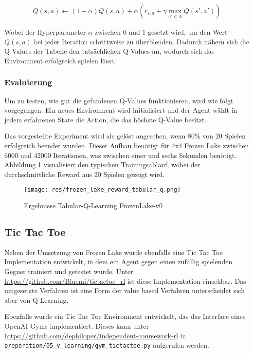\documentclass[11pt]{scrartcl}
\begin{document}
\begin{align}
  Q(s, a) \leftarrow (1 - \alpha)Q(s, a) +
  \alpha(r_{s, a} + \gamma \max_{a'\in A}Q(s', a'))
\label{aln:QValueAdapt}
\end{align}
\noindent

Wobei der Hyperparameter $\alpha$ zwischen 0 und 1 gesetzt wird, um den Wert $Q(s, a)$ bei
jeder Iteration schrittweise zu überblenden. Dadurch nähern sich die Q-Values der Tabelle
den tatsächlichen Q-Values an, wodurch sich das Environment erfolgreich spielen lässt.

\subsubsection{Evaluierung}
Um zu testen, wie gut die gefundenen Q-Values funktionieren, wird wie folgt vorgegangen.
Ein neues Environment wird initialisiert und der Agent wählt in jedem erfahrenen State die
Action, die das höchste Q-Value besitzt.

Das vorgestellte Experiment wird als gelöst angesehen, wenn 80\% von 20 Spielen erfolgreich
beendet wurden. Dieser Aufbau benötigt für 4x4 Frozen Lake zwischen 6000 und 42000
Iterationen, was zwischen einer und sechs Sekunden benötigt. Abbildung
\ref{fig:frozen-lake_q_learning} visualisiert den typischen Trainingsablauf, wobei der
durchschnittliche Reward aus 20 Spielen gezeigt wird.

\begin{figure}[htp]
\centering
\texttt{[image: res/frozen\_lake\_reward\_tabular\_q.png]}
\caption{Ergebnisse Tabular-Q-Learning FrozenLake-v0}
\label{fig:frozen-lake_q_learning}
\end{figure}


\subsection{Tic Tac Toe}
Neben der Umsetzung von Frozen Lake wurde ebenfalls eine Tic Tac Toe Implementation
entwickelt, in dem ein Agent gegen einen zufällig spielenden Gegner trainiert und getestet
wurde. Unter \url{https://github.com/Bluemi/tictactoe_rl} ist diese Implementation
einsehbar. Das umgesetzte Verfahren ist eine Form der value based Verfahren unterscheidet
sich aber von Q-Learning.

Ebenfalls wurde ein Tic Tac Toe Environment entwickelt, das das Interface eines OpenAI
Gyms implementiert. Dieses kann unter
\url{https://github.com/dephiloper/independent-coursework-rl} in
\lstinline!preparation/05_v_learning/gym_tictactoe.py! aufgerufen werden.
\end{document}
